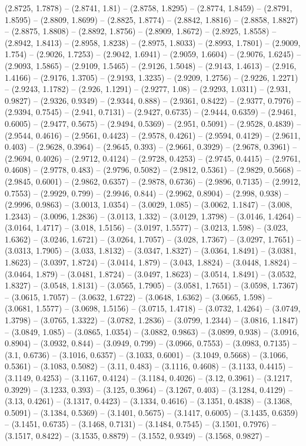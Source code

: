 (2.8725, 1.7878) -- (2.8741, 1.81) -- (2.8758, 1.8295) -- (2.8774, 1.8459) -- (2.8791, 1.8595) -- (2.8809, 1.8699) -- (2.8825, 1.8774) -- (2.8842, 1.8816) -- (2.8858, 1.8827) -- (2.8875, 1.8808) -- (2.8892, 1.8756) -- (2.8909, 1.8672) -- (2.8925, 1.8558) -- (2.8942, 1.8413) -- (2.8958, 1.8238) -- (2.8975, 1.8033) -- (2.8993, 1.7801) -- (2.9009, 1.754) -- (2.9026, 1.7253) -- (2.9042, 1.6941) -- (2.9059, 1.6604) -- (2.9076, 1.6245) -- (2.9093, 1.5865) -- (2.9109, 1.5465) -- (2.9126, 1.5048) -- (2.9143, 1.4613) -- (2.916, 1.4166) -- (2.9176, 1.3705) -- (2.9193, 1.3235) -- (2.9209, 1.2756) -- (2.9226, 1.2271) -- (2.9243, 1.1782) -- (2.926, 1.1291) -- (2.9277, 1.08) -- (2.9293, 1.0311) -- (2.931, 0.9827) -- (2.9326, 0.9349) -- (2.9344, 0.888) -- (2.9361, 0.8422) -- (2.9377, 0.7976) -- (2.9394, 0.7545) -- (2.941, 0.7131) -- (2.9427, 0.6735) -- (2.9444, 0.6359) -- (2.9461, 0.6005) -- (2.9477, 0.5675) -- (2.9494, 0.5369) -- (2.951, 0.5091) -- (2.9528, 0.4839) -- (2.9544, 0.4616) -- (2.9561, 0.4423) -- (2.9578, 0.4261) -- (2.9594, 0.4129) -- (2.9611, 0.403) -- (2.9628, 0.3964) -- (2.9645, 0.393) -- (2.9661, 0.3929) -- (2.9678, 0.3961) -- (2.9694, 0.4026) -- (2.9712, 0.4124) -- (2.9728, 0.4253) -- (2.9745, 0.4415) -- (2.9761, 0.4608) -- (2.9778, 0.483) -- (2.9796, 0.5082) -- (2.9812, 0.5361) -- (2.9829, 0.5668) -- (2.9845, 0.6001) -- (2.9862, 0.6357) -- (2.9878, 0.6736) -- (2.9896, 0.7135) -- (2.9912, 0.7553) -- (2.9929, 0.799) -- (2.9946, 0.844) -- (2.9962, 0.8904) -- (2.998, 0.938) -- (2.9996, 0.9863) -- (3.0013, 1.0354) -- (3.0029, 1.085) -- (3.0062, 1.1847) -- (3.008, 1.2343) -- (3.0096, 1.2836) -- (3.0113, 1.332) -- (3.0129, 1.3798) -- (3.0146, 1.4264) -- (3.0164, 1.4717) -- (3.018, 1.5156) -- (3.0197, 1.5577) -- (3.0213, 1.598) -- (3.023, 1.6362) -- (3.0246, 1.6721) -- (3.0264, 1.7057) -- (3.028, 1.7367) -- (3.0297, 1.7651) -- (3.0313, 1.7905) -- (3.033, 1.8132) -- (3.0347, 1.8327) -- (3.0364, 1.8491) -- (3.0381, 1.8623) -- (3.0397, 1.8724) -- (3.0414, 1.879) -- (3.043, 1.8824) -- (3.0448, 1.8824) -- (3.0464, 1.879) -- (3.0481, 1.8724) -- (3.0497, 1.8623) -- (3.0514, 1.8491) -- (3.0532, 1.8327) -- (3.0548, 1.8131) -- (3.0565, 1.7905) -- (3.0581, 1.7651) -- (3.0598, 1.7367) -- (3.0615, 1.7057) -- (3.0632, 1.6722) -- (3.0648, 1.6362) -- (3.0665, 1.598) -- (3.0681, 1.5577) -- (3.0698, 1.5156) -- (3.0715, 1.4718) -- (3.0732, 1.4264) -- (3.0749, 1.3798) -- (3.0765, 1.3322) -- (3.0782, 1.2836) -- (3.0799, 1.2344) -- (3.0816, 1.1847) -- (3.0849, 1.085) -- (3.0865, 1.0354) -- (3.0882, 0.9863) -- (3.0899, 0.938) -- (3.0916, 0.8904) -- (3.0932, 0.844) -- (3.0949, 0.799) -- (3.0966, 0.7553) -- (3.0983, 0.7135) -- (3.1, 0.6736) -- (3.1016, 0.6357) -- (3.1033, 0.6001) -- (3.1049, 0.5668) -- (3.1066, 0.5361) -- (3.1083, 0.5082) -- (3.11, 0.483) -- (3.1116, 0.4608) -- (3.1133, 0.4415) -- (3.1149, 0.4253) -- (3.1167, 0.4124) -- (3.1184, 0.4026) -- (3.12, 0.3961) -- (3.1217, 0.3929) -- (3.1233, 0.393) -- (3.125, 0.3964) -- (3.1267, 0.403) -- (3.1284, 0.4129) -- (3.13, 0.4261) -- (3.1317, 0.4423) -- (3.1334, 0.4616) -- (3.1351, 0.4838) -- (3.1368, 0.5091) -- (3.1384, 0.5369) -- (3.1401, 0.5675) -- (3.1417, 0.6005) -- (3.1435, 0.6359) -- (3.1451, 0.6735) -- (3.1468, 0.7131) -- (3.1484, 0.7545) -- (3.1501, 0.7976) -- (3.1517, 0.8422) -- (3.1535, 0.8879) -- (3.1552, 0.9349) -- (3.1568, 0.9827) -- 